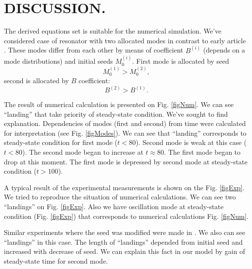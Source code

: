 \section{DISCUSSION.}

\noindent The derived equations set is suitable for the numerical
simulation. We've considered case of resonator with two allocated
modes in contrast to early article \cite{ourSemi}. These modes differ
from each other by means of coefficient $B^{(i)}$ (depends on a mode
distributions) and initial seeds $M_0^{(i)}$. First mode is allocated
by seed 
\[
M_0^{(1)} > M_0^{(2)},
\]
second is allocated by $B$ coefficient:
\[
B^{(2)} > B^{(1)}.
\]



The result of  numerical calculation  is
presented on Fig. \ref{figNum}.  We can see ``landing''  that take
priority of steady-state 
condition. We've sought to find explanation. Dependencies of modes
(first and second) from time were calculated for interpretation (see
Fig. \ref{figModes}). We can see that ``landing'' corresponds to  steady-state
condition for first mode ($t < 80$). Second mode is weak at this case
($t < 80$). The second mode began to increase at $t \approx 80$. The
first mode began to drop at this moment. The first mode is depressed
by second mode at steady-state condition ($t > 100$).  





A typical result of the experimental measurements is shown on the
Fig. \ref{figExp}. We tried to reproduce the situation of numerical
calculations. We can see two ``landings'' on Fig. \ref{figExp}. Also we
have oscillation mode at steady-state condition (Fig. \ref{figExp})
that corresponds to numerical calculations Fig. \ref{figNum}.

Similar experiments where the seed was modified were made in
\cite{Zozulya}. We also can see ``landings'' in this case.
The length of  ``landings'' depended from initial
seed and increased with decrease of seed. We can explain this
fact in our model by gain of steady-state time for second mode.\\
